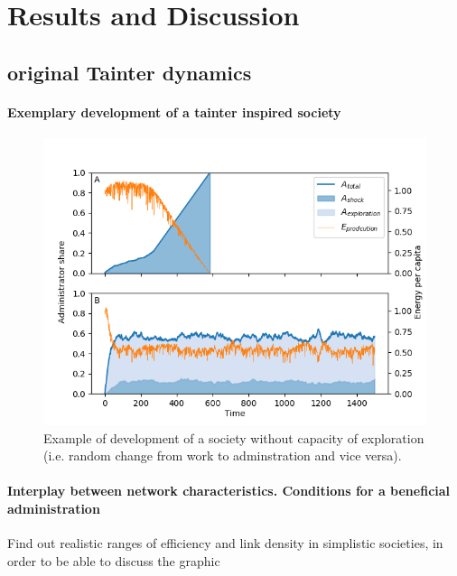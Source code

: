 \section{Results and Discussion}

\subsection{original Tainter dynamics}

\paragraph{Exemplary development of a tainter inspired society}

\begin{figure}[htb]
    \centering
    \includegraphics[width=\linewidth]{../figures/Admin_Ecap_twocases.png}
    \caption{Example of development of a society without capacity of exploration (i.e. random change from work to adminstration and vice versa). }
    \label{fig:baseNetworkDev}
\end{figure}


\paragraph{Interplay between network characteristics. Conditions for a beneficial administration}

Find out realistic ranges of efficiency and link density in simplistic societies, in order to be able to discuss the graphic


